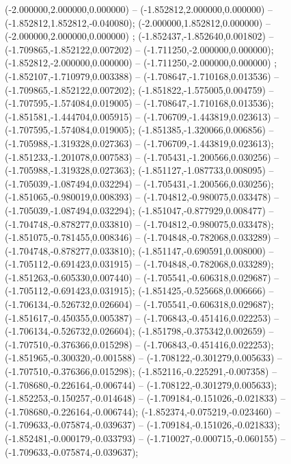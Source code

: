  (-2.000000,2.000000,0.000000) -- (-1.852812,2.000000,0.000000) -- (-1.852812,1.852812,-0.040080);
 (-2.000000,1.852812,0.000000) -- (-2.000000,2.000000,0.000000) ;
 (-1.852437,-1.852640,0.001802) -- (-1.709865,-1.852122,0.007202) -- (-1.711250,-2.000000,0.000000);
 (-1.852812,-2.000000,0.000000) -- (-1.711250,-2.000000,0.000000) ;
 (-1.852107,-1.710979,0.003388) -- (-1.708647,-1.710168,0.013536) -- (-1.709865,-1.852122,0.007202);
 (-1.851822,-1.575005,0.004759) -- (-1.707595,-1.574084,0.019005) -- (-1.708647,-1.710168,0.013536);
 (-1.851581,-1.444704,0.005915) -- (-1.706709,-1.443819,0.023613) -- (-1.707595,-1.574084,0.019005);
 (-1.851385,-1.320066,0.006856) -- (-1.705988,-1.319328,0.027363) -- (-1.706709,-1.443819,0.023613);
 (-1.851233,-1.201078,0.007583) -- (-1.705431,-1.200566,0.030256) -- (-1.705988,-1.319328,0.027363);
 (-1.851127,-1.087733,0.008095) -- (-1.705039,-1.087494,0.032294) -- (-1.705431,-1.200566,0.030256);
 (-1.851065,-0.980019,0.008393) -- (-1.704812,-0.980075,0.033478) -- (-1.705039,-1.087494,0.032294);
 (-1.851047,-0.877929,0.008477) -- (-1.704748,-0.878277,0.033810) -- (-1.704812,-0.980075,0.033478);
 (-1.851075,-0.781455,0.008346) -- (-1.704848,-0.782068,0.033289) -- (-1.704748,-0.878277,0.033810);
 (-1.851147,-0.690591,0.008000) -- (-1.705112,-0.691423,0.031915) -- (-1.704848,-0.782068,0.033289);
 (-1.851263,-0.605330,0.007440) -- (-1.705541,-0.606318,0.029687) -- (-1.705112,-0.691423,0.031915);
 (-1.851425,-0.525668,0.006666) -- (-1.706134,-0.526732,0.026604) -- (-1.705541,-0.606318,0.029687);
 (-1.851617,-0.450355,0.005387) -- (-1.706843,-0.451416,0.022253) -- (-1.706134,-0.526732,0.026604);
 (-1.851798,-0.375342,0.002659) -- (-1.707510,-0.376366,0.015298) -- (-1.706843,-0.451416,0.022253);
 (-1.851965,-0.300320,-0.001588) -- (-1.708122,-0.301279,0.005633) -- (-1.707510,-0.376366,0.015298);
 (-1.852116,-0.225291,-0.007358) -- (-1.708680,-0.226164,-0.006744) -- (-1.708122,-0.301279,0.005633);
 (-1.852253,-0.150257,-0.014648) -- (-1.709184,-0.151026,-0.021833) -- (-1.708680,-0.226164,-0.006744);
 (-1.852374,-0.075219,-0.023460) -- (-1.709633,-0.075874,-0.039637) -- (-1.709184,-0.151026,-0.021833);
 (-1.852481,-0.000179,-0.033793) -- (-1.710027,-0.000715,-0.060155) -- (-1.709633,-0.075874,-0.039637);
